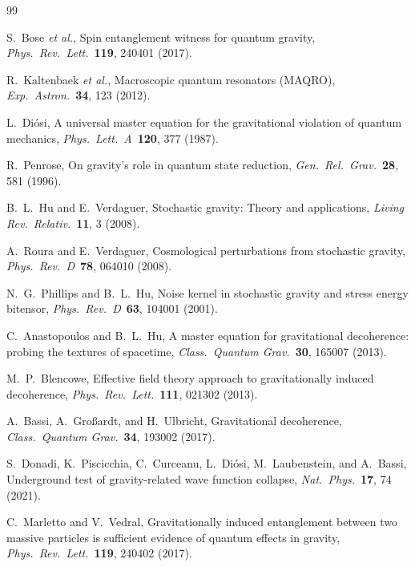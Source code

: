 \documentclass[12pt,a4paper]{article}
\theoremstyle{remark}
\begin{document}
\begin{thebibliography}{99}

 S.~Bose \textit{et al.}, Spin entanglement witness for quantum gravity,
\textit{Phys.\ Rev.\ Lett.}\ \textbf{119}, 240401 (2017).

 R.~Kaltenbaek \textit{et al.}, Macroscopic quantum resonators (MAQRO),
\textit{Exp.\ Astron.}\ \textbf{34}, 123 (2012).

 L.~Di\'osi, A universal master equation for the gravitational violation
of quantum mechanics, \textit{Phys.\ Lett.\ A}\ \textbf{120}, 377 (1987).

 R.~Penrose, On gravity's role in quantum state reduction,
\textit{Gen.\ Rel.\ Grav.}\ \textbf{28}, 581 (1996).

 B.~L.~Hu and E.~Verdaguer, Stochastic gravity: Theory and
applications, \textit{Living Rev.\ Relativ.}\ \textbf{11}, 3 (2008).

 A.~Roura and E.~Verdaguer, Cosmological perturbations from
stochastic gravity, \textit{Phys.\ Rev.\ D}\ \textbf{78}, 064010 (2008).

 N.~G.~Phillips and B.~L.~Hu, Noise kernel in stochastic gravity and
stress energy bitensor, \textit{Phys.\ Rev.\ D}\ \textbf{63}, 104001 (2001).

 C.~Anastopoulos and B.~L.~Hu, A master equation for
gravitational decoherence: probing the textures of spacetime,
\textit{Class.\ Quantum Grav.}\ \textbf{30}, 165007 (2013).

 M.~P.~Blencowe, Effective field theory approach to gravitationally
induced decoherence, \textit{Phys.\ Rev.\ Lett.}\ \textbf{111}, 021302 (2013).

 A.~Bassi, A.~Gro\ss ardt, and H.~Ulbricht, Gravitational
decoherence, \textit{Class.\ Quantum Grav.}\ \textbf{34}, 193002 (2017).

 S.~Donadi, K.~Piscicchia, C.~Curceanu, L.~Di\'osi, M.~Laubenstein, and
A.~Bassi, Underground test of gravity-related wave function collapse,
\textit{Nat.\ Phys.}\ \textbf{17}, 74 (2021).

 C.~Marletto and V.~Vedral, Gravitationally induced entanglement
between two massive particles is sufficient evidence of quantum effects in gravity,
\textit{Phys.\ Rev.\ Lett.}\ \textbf{119}, 240402 (2017).


\end{thebibliography}
\end{document}
